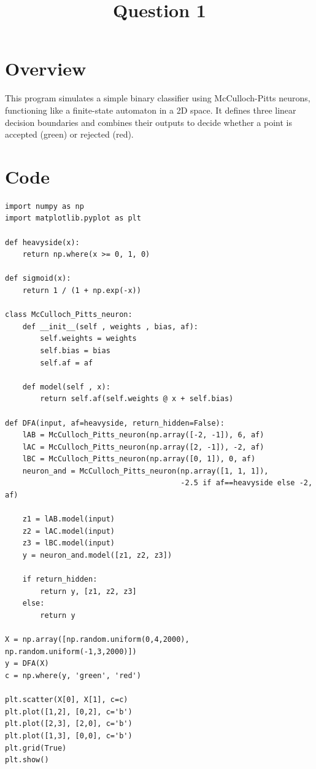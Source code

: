 \documentclass{article}
\title{Question 1}
\author{}
\date{}
\begin{document}
\maketitle

\section*{Overview}
This program simulates a simple binary classifier using McCulloch-Pitts neurons, functioning like a finite-state automaton in a 2D space. It defines three linear decision boundaries and combines their outputs to decide whether a point is accepted (green) or rejected (red).

\section*{Code}

\begin{verbatim}
import numpy as np
import matplotlib.pyplot as plt

def heavyside(x):
    return np.where(x >= 0, 1, 0)

def sigmoid(x):
    return 1 / (1 + np.exp(-x))

class McCulloch_Pitts_neuron:
    def __init__(self , weights , bias, af):
        self.weights = weights
        self.bias = bias
        self.af = af

    def model(self , x):
        return self.af(self.weights @ x + self.bias)

def DFA(input, af=heavyside, return_hidden=False):
    lAB = McCulloch_Pitts_neuron(np.array([-2, -1]), 6, af)
    lAC = McCulloch_Pitts_neuron(np.array([2, -1]), -2, af)
    lBC = McCulloch_Pitts_neuron(np.array([0, 1]), 0, af)
    neuron_and = McCulloch_Pitts_neuron(np.array([1, 1, 1]), 
                                        -2.5 if af==heavyside else -2, af)

    z1 = lAB.model(input)
    z2 = lAC.model(input)
    z3 = lBC.model(input)
    y = neuron_and.model([z1, z2, z3])

    if return_hidden:
        return y, [z1, z2, z3]
    else:
        return y 

X = np.array([np.random.uniform(0,4,2000), np.random.uniform(-1,3,2000)])
y = DFA(X)
c = np.where(y, 'green', 'red')

plt.scatter(X[0], X[1], c=c)
plt.plot([1,2], [0,2], c='b')
plt.plot([2,3], [2,0], c='b')
plt.plot([1,3], [0,0], c='b')
plt.grid(True)
plt.show()
\end{verbatim}
\end{document}
